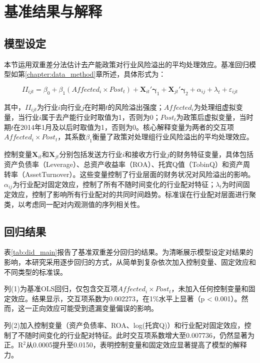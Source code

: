 \section{基准结果与解释}
\label{sec:baseline_did}

\subsection{模型设定}

本节运用双重差分法估计去产能政策对行业风险溢出的平均处理效应。基准回归模型如第\ref{chapter:data_method}章所述，具体形式为：

\begin{equation}
\label{eq:did_baseline}
II_{ijt} = \beta_0 + \beta_1 (Affected_i \times Post_t) + \bm{X}_{it}'\bm{\gamma}_1 + \bm{X}_{jt}'\bm{\gamma}_2 + \alpha_{ij} + \lambda_t + \varepsilon_{ijt}
\end{equation}

其中，$II_{ijt}$为行业$i$向行业$j$在时期$t$的风险溢出强度；$Affected_i$为处理组虚拟变量，当行业$i$属于去产能行业时取值为1，否则为0；$Post_t$为政策后虚拟变量，当时期$t$在2014年1月及以后时取值为1，否则为0。核心解释变量为两者的交互项$Affected_i \times Post_t$，其系数$\beta_1$衡量了政策对处理组行业风险溢出的平均处理效应。

控制变量$\bm{X}_{it}$和$\bm{X}_{jt}$分别包括发送方行业$i$和接收方行业$j$的财务特征变量，具体包括资产负债率（Leverage）、总资产收益率（ROA）、托宾Q值（TobinQ）和资产周转率（AssetTurnover）。这些变量控制了行业层面的财务状况对风险溢出的影响。$\alpha_{ij}$为行业配对固定效应，控制了所有不随时间变化的行业配对特征；$\lambda_t$为时间固定效应，控制了影响所有行业配对的共同时间趋势。标准误在行业配对层面进行聚类，以考虑同一配对内观测值的序列相关性\citep{bertrand2004much}。

\subsection{回归结果}

表\ref{tab:did_main}报告了基准双重差分回归的结果。为清晰展示模型设定对结果的影响，本研究采用逐步回归的方式，从简单到复杂依次加入控制变量、固定效应和不同类型的标准误。

列(1)为基准OLS回归，仅包含交互项$Affected_i \times Post_t$，未加入任何控制变量和固定效应。结果显示，交互项系数为0.002273，在1\%水平上显著（p < 0.001）。然而，这一正向效应可能受到遗漏变量偏误的影响。

列(2)加入控制变量（资产负债率、ROA、log(托宾Q)）和行业配对固定效应，控制了不随时间变化的行业配对特征。此时交互项系数增大至0.007736，仍然显著为正。R$^2$从0.0005提升至0.0150，表明控制变量和固定效应显著提高了模型的解释力。

